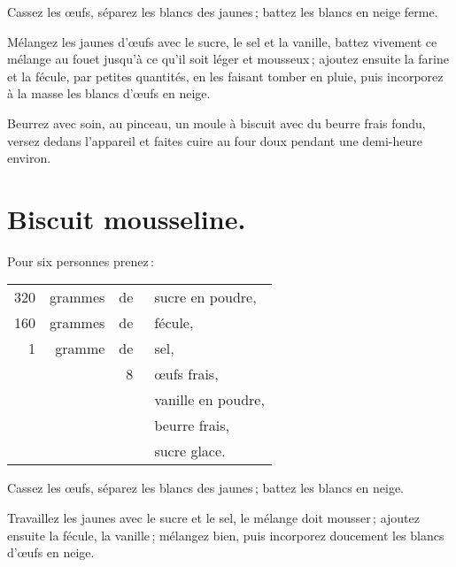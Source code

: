 Cassez les œufs, séparez les blancs des jaunes ; battez les blancs en neige
ferme.

Mélangez les jaunes d'œufs avec le sucre, le sel et la vanille, battez vivement
ce mélange au fouet jusqu'à ce qu'il soit léger et mousseux ; ajoutez ensuite
la farine et la fécule, par petites quantités, en les faisant tomber en pluie,
puis incorporez à la masse les blancs d'œufs en neige.

Beurrez avec soin, au pinceau, un moule à biscuit avec du beurre frais fondu,
versez dedans l'appareil et faites cuire au four doux pendant une demi-heure
environ.

\section*{\centering Biscuit mousseline.}
{}

Pour six personnes prenez :

\footnotesize
\begin{longtable}{rrrp{16em}}
    320 & grammes & de & sucre en poudre,                                                                 \\
    160 & grammes & de & fécule,                                                                          \\
      1 & gramme  & de & sel,                                                                             \\
        &         &  8 & œufs frais,                                                                      \\
        &         &    & vanille en poudre,                                                               \\
        &         &    & beurre frais,                                                                    \\
        &         &    & sucre glace.                                                                     \\
\end{longtable}
\normalsize

Cassez les œufs, séparez les blancs des jaunes ; battez les blancs en neige.

Travaillez les jaunes avec le sucre et le sel, le mélange doit mousser ;
ajoutez ensuite la fécule, la vanille ; mélangez bien, puis incorporez
doucement les blancs d'œufs en neige.

